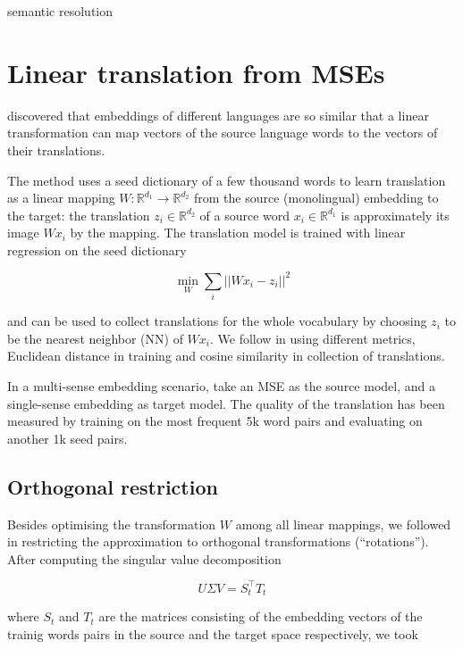 \documentclass[11pt]{article}
\newcommand{\Ro}{\mathbb{R}^{d_1}}
\newcommand{\Rt}{\mathbb{R}^{d_2}}
\begin{document}
semantic resolution

\section{Linear translation from MSEs}

 \cite{Mikolov:2013x} discovered that embeddings of different languages are so
 similar that a linear transformation can map vectors of the source language
 words to the vectors of their translations.

The method uses a seed dictionary of a few thousand words to learn translation
as a linear mapping $W: \mathbb{R}^{d_1}\rightarrow \mathbb{R}^{d_2}$ from the
source (monolingual) embedding to the target: the translation $z_i \in \Rt$ of
a source word $x_i \in \Ro$ is approximately its image $Wx_i$ by the mapping.
The translation model is trained with linear regression on the seed dictionary

\[\min_W \sum_i || Wx_i - z_i ||^2 \]

\noindent and can be used to collect translations for the whole vocabulary by
choosing $z_i$ to be the nearest neighbor (NN) of $Wx_i$.
We follow \cite{Mikolov:2013x} in using different metrics, Euclidean
 distance in training and cosine similarity in collection of translations.

In a multi-sense embedding scenario, \cite{Borbely:2016} take an MSE as the
source model, and a single-sense embedding as target model.  The quality of the
translation has been measured by training on the most frequent 5k word pairs
and evaluating on another 1k seed pairs.

\subsection{Orthogonal restriction}

Besides optimising the transformation $W$ among all linear mappings, we
followed \cite{Xing:2015} in restricting the approximation to orthogonal
transformations (``rotations''). After computing the singular value
decomposition

\[U\Sigma V=S_t^\top T_t\]

\noindent where $S_t$ and $T_t$ are the matrices consisting of the embedding vectors of
the trainig words pairs in the source and the target space respectively, we
took
\end{document}
